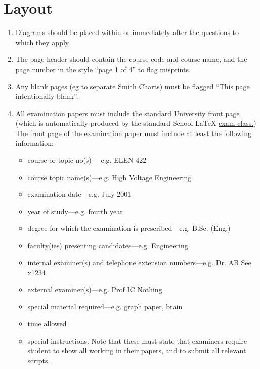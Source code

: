 \documentclass{ArcHandout}
\begin{document}
\section{Layout}
\begin{enumerate}

  \item Diagrams should be placed within or immediately after the questions
  to which they apply.

  \item The page header should contain the course code and course name,
  and the page number in the style ``page 1 of 4'' to flag misprints.

  \item Any blank pages (eg to separate Smith Charts) must be flagged
  ``This page intentionally blank''.

  \item All examination papers must include the standard University front
  page (which is automatically produced by the standard School LaTeX{}
  \href{http://ytdp.ee.wits.ac.za/ArcExam.zip}{exam class.}) The front page
  of the examination paper must include at least the following information:
  \begin{itemize}
    \item {course or topic no(s)}--- e.g. ELEN 422
    \item {course topic name(s)}---e.g. High Voltage Engineering
    \item {examination date}---e.g. July 2001
    \item {year of study}---e.g. fourth year
    \item {degree for which the examination is prescribed}---e.g.  B.Sc.
    (Eng.)
    \item {faculty(ies) presenting candidates}---e.g. Engineering
    \item {internal examiner(s) and telephone extension numbers}---e.g. Dr.
    AB See x1234
    \item {external examiner(s)}---e.g. Prof IC Nothing
    \item {special material required}---e.g. graph paper, brain
    \item {time allowed}
    \item {special instructions.} Note that these must state that examiners
    require student to show all working in their papers, and to submit all
    relevant scripts.
  \end{itemize}
\end{enumerate}
\end{document}
